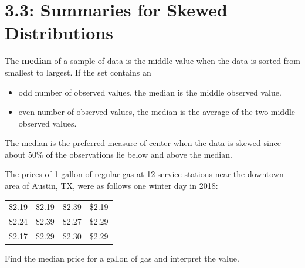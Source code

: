 \documentclass[../mathNotesPreamble]{subfiles}
\begin{document}
  \section{3.3: Summaries for Skewed Distributions}
  \begin{defn*}
    The \textbf{median} of a sample of data is the middle value when the data is sorted from smallest to largest. If the set contains an
    \begin{itemize}
      \item odd number of observed values, the median is the middle observed value.
      \item even number of observed values, the median is the average of the two middle observed values.
    \end{itemize}
    The median is the preferred measure of center when the data is skewed since about 50\% of the observations lie below and above the median.
  \end{defn*}
  
  \begin{ex*}
    The prices of 1 gallon of regular gas at 12 service stations near the downtown area of Austin, TX, were as follows one winter day in 2018:
    \vspace*{\baselineskip}
    
    \noindent
    \begin{minipage}{0.4\linewidth}
      \begin{center}
        \begin{tabular}{@{}*{4}{c}@{}}\toprule
          \$2.19 & \$2.19 & \$2.39 & \$2.19 \\
          \$2.24 & \$2.39 & \$2.27 & \$2.29 \\
          \$2.17 & \$2.29 & \$2.30 & \$2.29 \\\bottomrule
        \end{tabular}
      \end{center}
    \end{minipage}
    \begin{minipage}{0.6\linewidth}
      \centering
    \end{minipage}
  \end{ex*}
  \noindent Find the median price for a gallon of gas and interpret the value.
  \pagebreak
  
\end{document}
